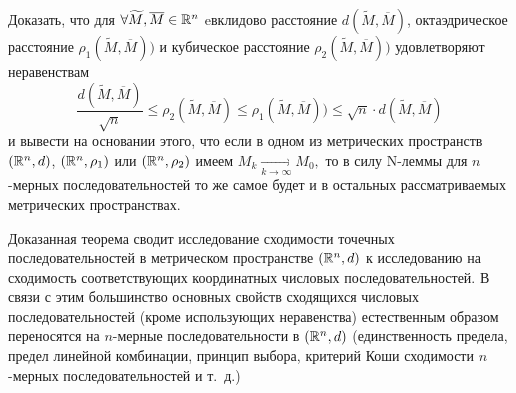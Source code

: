 \documentclass[../../main.tex]{subfiles}
\begin{document}
  \begin{exc}
    Доказать, что для $\forall \widetilde M, \overline{M} \in \mathbb{R}^n$ 
    eвклидово расстояние $d(\widetilde M, \overline{M})$, 
    октаэдрическое расстояние $\rho_1(\widetilde M, \overline{M}))$ 
    и кубическое расстояние $\rho_2(\widetilde M, \overline{M}))$ 
    удовлетворяют неравенствам
    \[
    \frac{d(\widetilde M, \overline{M})}{\sqrt{n}} \leq 
    \rho_2(\widetilde M, \overline{M}) \leq \rho_1(\widetilde M, 
    \overline{M})) \leq \sqrt{n}\cdot d(\widetilde M, \overline{M})
    \]
     и вывести на основании этого, что если в одном из метрических 
     пространств $(\mathbb{R}^n, d)$, $(\mathbb{R}^n, \rho_1)$ или $(\mathbb{R}^n, \rho_2)$ 
     имеем $M_k \underset{k\rightarrow\infty}{\longrightarrow}  M_0,$
     то в силу N-леммы для $n$-мерных последовательностей 
     то же самое будет и в остальных рассматриваемых метрических пространствах.
  \end{exc}
  
  \begin{rem}
    Доказанная теорема сводит исследование сходимости точечных 
    последовательностей в метрическом пространстве $(\mathbb{R}^n, d)$ к 
    исследованию на сходимость соответствующих координатных числовых 
    последовательностей.
    В связи с этим большинство основных свойств сходящихся числовых 
    последовательностей (кроме использующих неравенства) естественным
    образом переносятся на $n$-мерные последовательности в $(\mathbb{R}^n, d)$
    (единственность предела, предел линейной комбинации, принцип 
    выбора, критерий Коши сходимости $n$-мерных последовательностей и 
    т.~д.)
  \end{rem}
  
\end{document}
